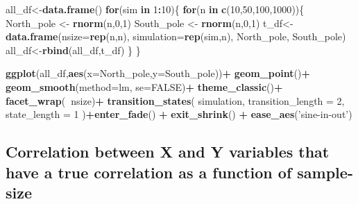 \documentclass[
]{book}
\newenvironment{Shaded}{\begin{snugshade}}{\end{snugshade}}
\newcommand{\ControlFlowTok}[1]{\textcolor[rgb]{0.13,0.29,0.53}{\textbf{#1}}}
\newcommand{\DataTypeTok}[1]{\textcolor[rgb]{0.13,0.29,0.53}{#1}}
\newcommand{\DecValTok}[1]{\textcolor[rgb]{0.00,0.00,0.81}{#1}}
\newcommand{\KeywordTok}[1]{\textcolor[rgb]{0.13,0.29,0.53}{\textbf{#1}}}
\newcommand{\NormalTok}[1]{#1}
\newcommand{\OperatorTok}[1]{\textcolor[rgb]{0.81,0.36,0.00}{\textbf{#1}}}
\newcommand{\OtherTok}[1]{\textcolor[rgb]{0.56,0.35,0.01}{#1}}
\newcommand{\StringTok}[1]{\textcolor[rgb]{0.31,0.60,0.02}{#1}}
\begin{document}
\begin{Shaded}
\begin{Highlighting}[]
\NormalTok{all_df<-}\KeywordTok{data.frame}\NormalTok{()}
\ControlFlowTok{for}\NormalTok{(sim }\ControlFlowTok{in} \DecValTok{1}\OperatorTok{:}\DecValTok{10}\NormalTok{)\{}
  \ControlFlowTok{for}\NormalTok{(n }\ControlFlowTok{in} \KeywordTok{c}\NormalTok{(}\DecValTok{10}\NormalTok{,}\DecValTok{50}\NormalTok{,}\DecValTok{100}\NormalTok{,}\DecValTok{1000}\NormalTok{))\{}
\NormalTok{  North_pole <-}\StringTok{ }\KeywordTok{rnorm}\NormalTok{(n,}\DecValTok{0}\NormalTok{,}\DecValTok{1}\NormalTok{)}
\NormalTok{  South_pole <-}\StringTok{ }\KeywordTok{rnorm}\NormalTok{(n,}\DecValTok{0}\NormalTok{,}\DecValTok{1}\NormalTok{)}
\NormalTok{  t_df<-}\KeywordTok{data.frame}\NormalTok{(}\DataTypeTok{nsize=}\KeywordTok{rep}\NormalTok{(n,n),}
                   \DataTypeTok{simulation=}\KeywordTok{rep}\NormalTok{(sim,n),}
\NormalTok{                                  North_pole,}
\NormalTok{                                  South_pole)}
\NormalTok{  all_df<-}\KeywordTok{rbind}\NormalTok{(all_df,t_df)}
\NormalTok{  \}}
\NormalTok{\}}


\KeywordTok{ggplot}\NormalTok{(all_df,}\KeywordTok{aes}\NormalTok{(}\DataTypeTok{x=}\NormalTok{North_pole,}\DataTypeTok{y=}\NormalTok{South_pole))}\OperatorTok{+}
\StringTok{  }\KeywordTok{geom_point}\NormalTok{()}\OperatorTok{+}
\StringTok{  }\KeywordTok{geom_smooth}\NormalTok{(}\DataTypeTok{method=}\NormalTok{lm, }\DataTypeTok{se=}\OtherTok{FALSE}\NormalTok{)}\OperatorTok{+}
\StringTok{  }\KeywordTok{theme_classic}\NormalTok{()}\OperatorTok{+}
\StringTok{  }\KeywordTok{facet_wrap}\NormalTok{(}\OperatorTok{~}\NormalTok{nsize)}\OperatorTok{+}
\StringTok{  }\KeywordTok{transition_states}\NormalTok{(}
\NormalTok{    simulation,}
    \DataTypeTok{transition_length =} \DecValTok{2}\NormalTok{,}
    \DataTypeTok{state_length =} \DecValTok{1}
\NormalTok{  )}\OperatorTok{+}\KeywordTok{enter_fade}\NormalTok{() }\OperatorTok{+}\StringTok{ }
\StringTok{  }\KeywordTok{exit_shrink}\NormalTok{() }\OperatorTok{+}
\StringTok{  }\KeywordTok{ease_aes}\NormalTok{(}\StringTok{'sine-in-out'}\NormalTok{)}
\end{Highlighting}
\end{Shaded}

\hypertarget{correlation-between-x-and-y-variables-that-have-a-true-correlation-as-a-function-of-sample-size}{%
\subsection{Correlation between X and Y variables that have a true correlation as a function of sample-size}\label{correlation-between-x-and-y-variables-that-have-a-true-correlation-as-a-function-of-sample-size}}
\end{document}
